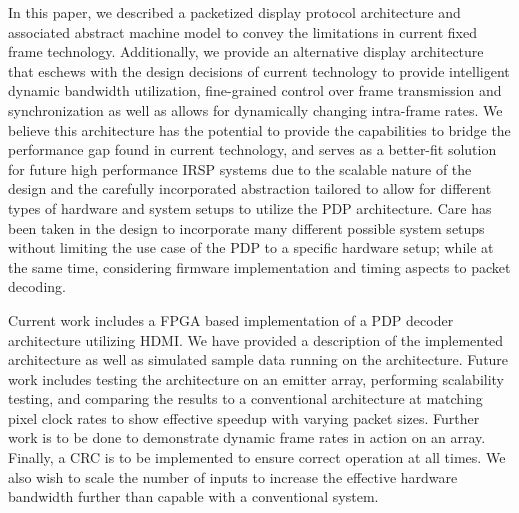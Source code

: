 \label{chap:conclusion}
In this paper, we described a packetized display protocol architecture and associated abstract machine model to convey the limitations in current fixed frame technology. Additionally, we provide an alternative display architecture that eschews with the design decisions of current technology to provide intelligent dynamic bandwidth utilization, fine-grained control over frame transmission and synchronization as well as allows for dynamically changing intra-frame rates. We believe this architecture has the potential to provide the capabilities to bridge the performance gap found in current technology, and serves as a better-fit solution for future high performance IRSP systems due to the scalable nature of the design and the carefully incorporated abstraction tailored to allow for different types of hardware and system setups to utilize the PDP architecture. Care has been taken in the design to incorporate many different possible system setups without limiting the use case of the PDP to a specific hardware setup; while at the same time, considering firmware implementation and timing aspects to packet decoding.

Current work includes a FPGA based implementation of a PDP decoder architecture utilizing HDMI. We have provided a description of the implemented architecture as well as simulated sample data running on the architecture. Future work includes testing the architecture on an emitter array, performing scalability testing, and comparing the results to a conventional architecture at matching pixel clock rates to show effective speedup with varying packet sizes. Further work is to be done to demonstrate dynamic frame rates in action on an array. Finally, a CRC is to be implemented to ensure correct operation at all times. We also wish to scale the number of inputs to increase the effective hardware bandwidth further than capable with a conventional system.
